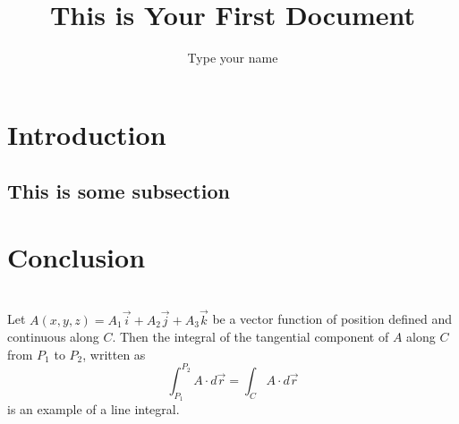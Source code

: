 \documentclass[a4paper,onecolumn]{article}
\title{This is Your First Document}
\author{Type your name}
\begin{document}
\maketitle

\tableofcontents %

\section{Introduction}
\lipsum[1]

	\subsection{This is some subsection}
	\lipsum[2]

\section{Conclusion}
\lipsum[8]\\

Let $A(x,y,z) = A_1 \overrightarrow{i} +  A_2 \overrightarrow{j} +  A_3\overrightarrow{k}$ be a vector function of position defined and continuous along $C$. Then the integral of the tangential component of $A$ along $C$ from $P_1$ to $P_2$, written as 
\begin{equation*}
\int_{P_1}^{P_2} A\cdot d\overrightarrow{r} = \int_{C} A\cdot d\overrightarrow{r}
\end{equation*} 
is an example of a line integral. 
\end{document}
